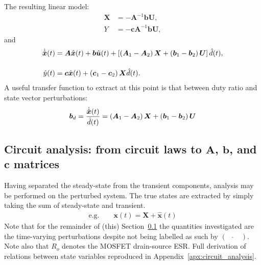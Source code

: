 \newpar
The resulting linear model:
\begin{align}
\boldsymbol{X} &= \minus \boldsymbol{A}^{-1} \boldsymbol{b} \boldsymbol{U},
\nonumber
\\[11pt]
Y &= \minus \boldsymbol{c} \boldsymbol{A}^{-1} \boldsymbol{b} \boldsymbol{U},
\label{eqn:modelY}
\end{align}
and
\begin{align*}
\dot{\hat{\boldsymbol{x}}}(t)
&= \boldsymbol{A} \hat{\boldsymbol{x}}(t) + \boldsymbol{b} \hat{\boldsymbol{u}}(t)
+ \left[\left(\boldsymbol{A}_1 - \boldsymbol{A}_2\right)\boldsymbol{X} + \left(\boldsymbol{b}_1 - \boldsymbol{b}_2\right)\boldsymbol{U}\right] \hat{d}(t),
\\[11pt]
\hat{y}(t) &= \boldsymbol{c} \hat{\boldsymbol{x}}(t) + \left(\boldsymbol{c}_1 - \boldsymbol{c}_2\right) \boldsymbol{X} \hat{d}(t).
\end{align*}
A useful transfer function to extract at this point is that between duty ratio and state vector perturbations:
\begin{align}
\boldsymbol{b}_d = \frac{\dot{\hat{\boldsymbol{x}}}(t)}{\hat{d}(t)} = \left(\boldsymbol{A}_1 - \boldsymbol{A}_2\right)\boldsymbol{X} + \left(\boldsymbol{b}_1 - \boldsymbol{b}_2\right)\boldsymbol{U}
\label{eqn:bD}
\end{align}
\subsection{Circuit analysis: from circuit laws to $\boldsymbol{A}$, $\boldsymbol{b}$, and $\boldsymbol{c}$ matrices}\label{sec:circuitanalysis}
Having separated the steady-state from the transient components, analysis may be performed on the perturbed system. The true states are extracted by simply taking the sum of steady-state and transient.
\begin{align*}
\text{e.g.} \qquad \boldsymbol{x}(t) = \boldsymbol{X} + \hat{\boldsymbol{x}}(t)
\end{align*}
Note that for the remainder of (this) Section~\ref{sec:circuitanalysis} the quantities investigated are the time-varying perturbations despite not being labelled as such by $(\quad\hat{}\quad)$.
\newpar
Note also that $R_o$ denotes the MOSFET drain-source ESR.
\newpar
Full derivation of relations between state variables reproduced in Appendix~\ref{apx:circuit_analysis}.
